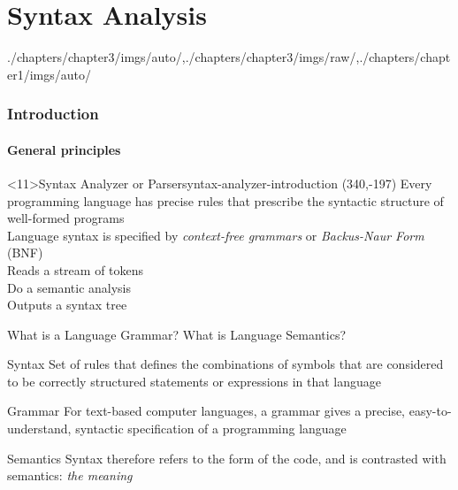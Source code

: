 \part[author={\protect\insertauthor},label={chap:syntax_analysis}]{Syntax Analysis}

\begin{graphicspathcontext}{{./chapters/chapter3/imgs/auto/},{./chapters/chapter3/imgs/raw/},{./chapters/chapter1/imgs/auto/}}
\begin{bibunit}[apalike]
	
\tableofcontentslide

\section{Introduction}
\sectiontableofcontentslide

\subsection{General principles}

\begin{rightlawnframe}<11>{{Syntax Analyzer} or Parser}{syntax-analyzer-introduction}
	\putat*(340,-197){}
	Every programming language has precise rules that prescribe the syntactic structure of well-formed programs \\[.25cm]
	Language syntax is specified by \emph{context-free grammars} or \emph{Backus-Naur Form} (BNF) \\[.25cm]
	Reads a stream of tokens \\[.25cm]
	Do a semantic analysis \\[.25cm]
	Outputs a syntax tree
\end{rightlawnframe}

\begin{frame}{{What is a Language Grammar?} What is Language Semantics?}
	\begin{definitionblock}{Syntax}
		Set of rules that defines the combinations of symbols that are considered to be correctly structured statements or expressions in that language
	\end{definitionblock}
	\vspace{.25cm}
	\begin{definitionblock}{Grammar}
		For text-based computer languages, a grammar gives a precise, easy-to-understand, syntactic specification of a programming language
	\end{definitionblock}
	\vspace{.25cm}
	\begin{definitionblock}{Semantics}
		Syntax therefore refers to the form of the code, and is contrasted with semantics: \emph{the meaning}
	\end{definitionblock}
\end{frame}


\end{bibunit}
\end{graphicspathcontext}
